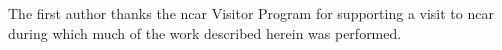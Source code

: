 %





%
\begin{acks}
The first author thanks the
\gls{ncar} Visitor Program for supporting a visit to \gls{ncar} during which
much of the work described herein was performed.


\end{acks}
